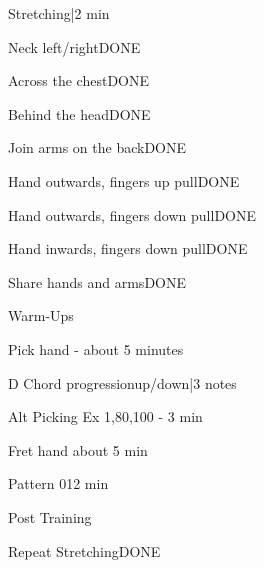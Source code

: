
\usepackage{wasysym}

\newcommand{\beat}[1]{\quarternote=#1}




\begin{checklist}{Stretching|2 min}
  \item{Neck left/right}{DONE}
  \item{Across the chest}{DONE}
  \item{Behind the head}{DONE}
  \item{Join arms on the back}{DONE}
  \item{Hand outwards, fingers up pull}{DONE}
  \item{Hand outwards, fingers down pull}{DONE}
  \item{Hand inwards, fingers down pull}{DONE}
  \item{Share hands and arms}{DONE}
\end{checklist}

\begin{task}{Warm-Ups}

  \begin{checklist}{Pick hand - about 5 minutes}
    \item{D Chord progression}{up/down|3 notes}
    \item{Alt Picking Ex 1}{\beat{60,80,100} - 3 min}
  \end{checklist}

  \begin{checklist}{Fret hand about 5 min}
    \item{Pattern 01}{2 min}
  \end{checklist}

\end{task}

\begin{checklist}{Post Training}
  \item{Repeat Stretching}{DONE}
\end{checklist}


